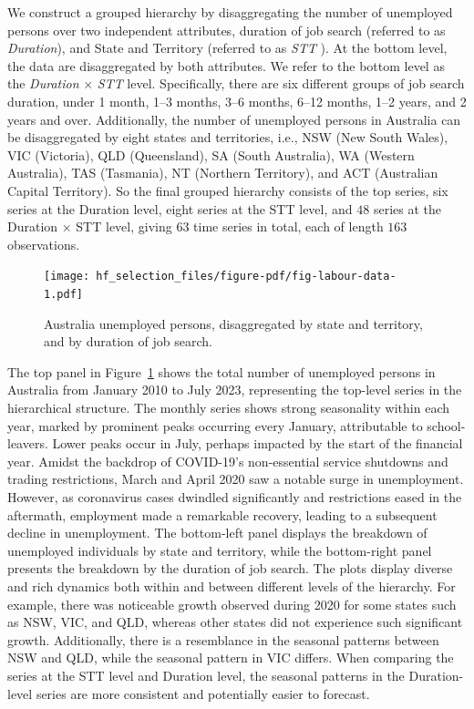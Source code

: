 \documentclass[
  11pt]{article}
\begin{document}
We construct a grouped hierarchy by disaggregating the number of
unemployed persons over two independent attributes, duration of job
search (referred to as \emph{Duration}), and State and Territory
(referred to as \emph{STT} ). At the bottom level, the data are
disaggregated by both attributes. We refer to the bottom level as the
\emph{Duration} \(\times\) \emph{STT} level. Specifically, there are six
different groups of job search duration, under 1 month, 1--3 months,
3--6 months, 6--12 months, 1--2 years, and 2 years and over.
Additionally, the number of unemployed persons in Australia can be
disaggregated by eight states and territories, i.e., NSW (New South
Wales), VIC (Victoria), QLD (Queensland), SA (South Australia), WA
(Western Australia), TAS (Tasmania), NT (Northern Territory), and ACT
(Australian Capital Territory). So the final grouped hierarchy consists
of the top series, six series at the Duration level, eight series at the
STT level, and \(48\) series at the Duration \(\times\) STT level,
giving \(63\) time series in total, each of length \(163\) observations.

\begin{figure}[!t]

{\centering \texttt{[image: hf\_selection\_files/figure-pdf/fig-labour-data-1.pdf]}

}

\caption{\label{fig-labour-data}Australia unemployed persons,
disaggregated by state and territory, and by duration of job search.}

\end{figure}

The top panel in Figure~\ref{fig-labour-data} shows the total number of
unemployed persons in Australia from January 2010 to July 2023,
representing the top-level series in the hierarchical structure. The
monthly series shows strong seasonality within each year, marked by
prominent peaks occurring every January, attributable to school-leavers.
Lower peaks occur in July, perhaps impacted by the start of the
financial year. Amidst the backdrop of COVID-19's non-essential service
shutdowns and trading restrictions, March and April 2020 saw a notable
surge in unemployment. However, as coronavirus cases dwindled
significantly and restrictions eased in the aftermath, employment made a
remarkable recovery, leading to a subsequent decline in unemployment.
The bottom-left panel displays the breakdown of unemployed individuals
by state and territory, while the bottom-right panel presents the
breakdown by the duration of job search. The plots display diverse and
rich dynamics both within and between different levels of the hierarchy.
For example, there was noticeable growth observed during 2020 for some
states such as NSW, VIC, and QLD, whereas other states did not
experience such significant growth. Additionally, there is a resemblance
in the seasonal patterns between NSW and QLD, while the seasonal pattern
in VIC differs. When comparing the series at the STT level and Duration
level, the seasonal patterns in the Duration-level series are more
consistent and potentially easier to forecast.
\end{document}
